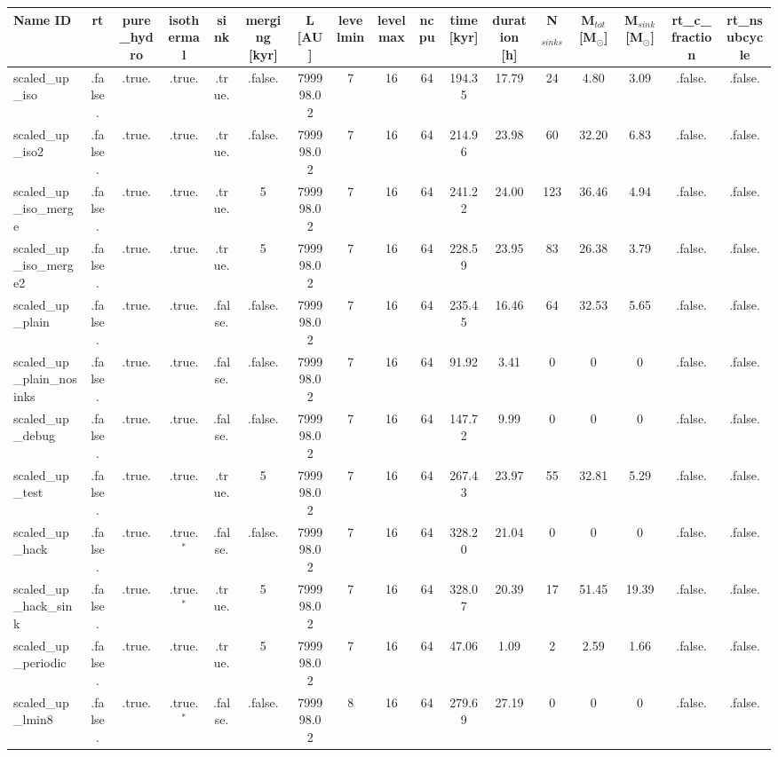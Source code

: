 \begin{table}
\begin{adjustbox}{width=1.8\textheight}
\begin{tabular}{lcccccccccccccccc}
\toprule
Name ID & rt & pure\_hydro & isothermal & sink & merging [kyr] & L [AU] & levelmin & levelmax & ncpu & time [kyr] & duration [h] & N$_{sinks}$ & M$_{tot}$ [M$_{\odot}$] & M$_{sink}$ [M$_{\odot}$] & rt\_c\_fraction & rt\_nsubcycle \\
\midrule
scaled\_up\_iso & .false. & .true. & .true. & .true. & .false. & 799998.02 & 7 & 16 & 64 & 194.35 & 17.79 & 24 & 4.80 & 3.09 & .false. & .false. \\
scaled\_up\_iso2 & .false. & .true. & .true. & .true. & .false. & 799998.02 & 7 & 16 & 64 & 214.96 & 23.98 & 60 & 32.20 & 6.83 & .false. & .false. \\
scaled\_up\_iso\_merge & .false. & .true. & .true. & .true. & 5 & 799998.02 & 7 & 16 & 64 & 241.22 & 24.00 & 123 & 36.46 & 4.94 & .false. & .false. \\
scaled\_up\_iso\_merge2 & .false. & .true. & .true. & .true. & 5 & 799998.02 & 7 & 16 & 64 & 228.59 & 23.95 & 83 & 26.38 & 3.79 & .false. & .false. \\
scaled\_up\_plain & .false. & .true. & .true. & .false. & .false. & 799998.02 & 7 & 16 & 64 & 235.45 & 16.46 & 64 & 32.53 & 5.65 & .false. & .false. \\
scaled\_up\_plain\_nosinks & .false. & .true. & .true. & .false. & .false. & 799998.02 & 7 & 16 & 64 & 91.92 & 3.41 & 0 & 0 & 0 & .false. & .false. \\
scaled\_up\_debug & .false. & .true. & .true. & .false. & .false. & 799998.02 & 7 & 16 & 64 & 147.72 & 9.99 & 0 & 0 & 0 & .false. & .false. \\
scaled\_up\_test & .false. & .true. & .true. & .true. & 5 & 799998.02 & 7 & 16 & 64 & 267.43 & 23.97 & 55 & 32.81 & 5.29 & .false. & .false. \\
scaled\_up\_hack & .false. & .true. & .true.$^{\ast}$ & .false. & .false. & 799998.02 & 7 & 16 & 64 & 328.20 & 21.04 & 0 & 0 & 0 & .false. & .false. \\
scaled\_up\_hack\_sink & .false. & .true. & .true.$^{\ast}$ & .true. & 5 & 799998.02 & 7 & 16 & 64 & 328.07 & 20.39 & 17 & 51.45 & 19.39 & .false. & .false. \\
scaled\_up\_periodic & .false. & .true. & .true. & .true. & 5 & 799998.02 & 7 & 16 & 64 & 47.06 & 1.09 & 2 & 2.59 & 1.66 & .false. & .false. \\
scaled\_up\_lmin8 & .false. & .true. & .true.$^{\ast}$ & .false. & .false. & 799998.02 & 8 & 16 & 64 & 279.69 & 27.19 & 0 & 0 & 0 & .false. & .false. \\

\end{tabular}
\end{adjustbox}
\end{table}
